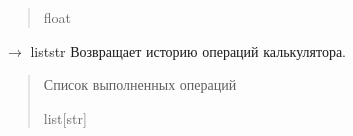 \documentclass[letterpaper,10pt,russian]{sphinxmanual}
\begin{document}
\begin{fulllineitems}
\begin{fulllineitems}
\begin{quote}
\begin{description}
\sphinxAtStartPar
float

\end{description}\end{quote}

\end{fulllineitems}


\begin{fulllineitems}
\label{\detokenize{Calculator:Calculator.Calculator.get_history}}
\pysigstartsignatures
\pysiglinewithargsret
{}
{}
{{ $\rightarrow$ list\DUrole{p}{{[}}str\DUrole{p}{{]}}}}
\pysigstopsignatures
\sphinxAtStartPar
Возвращает историю операций калькулятора.
\begin{quote}\begin{description}
\sphinxAtStartPar
Список выполненных операций

\sphinxAtStartPar
list{[}str{]}

\end{description}\end{quote}

\end{fulllineitems}


\end{fulllineitems}

\end{document}
